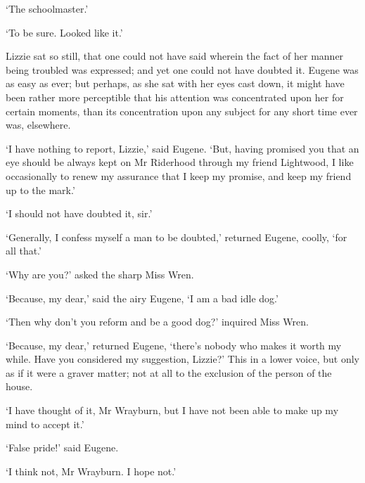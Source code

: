 ‘The schoolmaster.’

‘To be sure. Looked like it.’

Lizzie sat so still, that one could not have said wherein the fact of
her manner being troubled was expressed; and yet one could not have
doubted it. Eugene was as easy as ever; but perhaps, as she sat with
her eyes cast down, it might have been rather more perceptible that
his attention was concentrated upon her for certain moments, than its
concentration upon any subject for any short time ever was, elsewhere.

‘I have nothing to report, Lizzie,’ said Eugene. ‘But, having promised
you that an eye should be always kept on Mr Riderhood through my friend
Lightwood, I like occasionally to renew my assurance that I keep my
promise, and keep my friend up to the mark.’

‘I should not have doubted it, sir.’

‘Generally, I confess myself a man to be doubted,’ returned Eugene,
coolly, ‘for all that.’

‘Why are you?’ asked the sharp Miss Wren.

‘Because, my dear,’ said the airy Eugene, ‘I am a bad idle dog.’

‘Then why don’t you reform and be a good dog?’ inquired Miss Wren.

‘Because, my dear,’ returned Eugene, ‘there’s nobody who makes it worth
my while. Have you considered my suggestion, Lizzie?’ This in a lower
voice, but only as if it were a graver matter; not at all to the
exclusion of the person of the house.

‘I have thought of it, Mr Wrayburn, but I have not been able to make up
my mind to accept it.’

‘False pride!’ said Eugene.

‘I think not, Mr Wrayburn. I hope not.’

